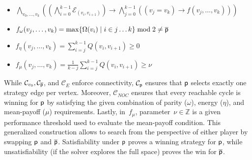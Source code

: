 \documentclass[runningheads]{llncs}
\begin{document}
\begin{definition}
\begin{itemize}[leftmargin=2.1cm, labelwidth=1.7cm, align=left, itemsep=1.0ex, parsep=0pt]

        \item [$\mathcal{C}_{NOC}(f)$ :] $\bigwedge_{v_0, \dots, v_k} \left( \left(\bigwedge_{i=0}^{k-1} \mathcal{E}_{(v_i,v_{i+1})}\right) \to \bigwedge_{j=0}^{k-1} ((v_j = v_k) \to f(v_j, \dots, v_k)) \right)$

    \end{itemize}
    \begin{itemize}[itemsep=1.0ex, parsep=0pt]
        \item $f_\omega(v_j, \dots, v_k) = \max\{\Omega(v_i) \mid i\in j\dots k\} \bmod 2 \ne \overline{\mathsf{p}}$

        \item $f_\eta(v_j, \dots, v_k) = \sum_{i=j}^{k-1} Q(v_i, v_{i+1}) \ge 0$

        \item $f_\mu(v_j, \dots, v_k) = \frac{1}{k-j} \sum_{i=j}^{k-1} Q(v_i, v_{i+1}) \ge \nu$
    \end{itemize}
\end{definition}

While $\mathcal{C}_{v_0}, \mathcal{C}_{\overline{\mathsf{p}}}$, and $\mathcal{C}_{\!E}$ %
enforce connectivity, 
$\mathcal{C}_{\mathsf{p}}$ ensures that $\mathsf{p}$ selects exactly one strategy edge per vertex.  
Moreover, $\mathcal{C}_{\!N\!O\!C}$ ensures that every reachable cycle is winning for $\mathsf{p}$ by satisfying the given combination of parity ($\omega$), energy ($\eta$), and mean-payoff ($\mu$) requirements. Lastly, in~$f_\mu$, parameter~$\nu \in \mathbb{Z}$ is a given performance threshold used to evaluate the mean-payoff condition. This generalized construction allows \nocq to search from the perspective of either player by swapping $\mathsf{p}$ and $\overline{\mathsf{p}}$. Satisfiability under $\mathsf{p}$ proves a winning strategy for $\mathsf{p}$, while unsatisfiability (if the solver explores the full space) proves the win for $\overline{\mathsf{p}}$.
\end{document}
